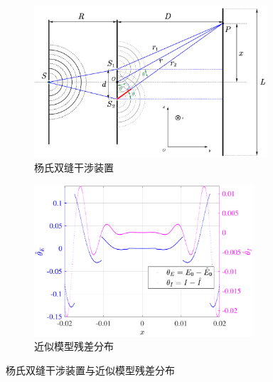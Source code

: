 \documentclass[UTF8]{report}
\theoremstyle{MyLineTheoremStyle} %
\theoremstyle{MyBlockTheoremStyle} %
\theoremstyle{MySubsubsectionStyle} %
\begin{document}
\begin{figure}[H]\centering
    \begin{subfigure}[t]{0.52\columnwidth}\centering
        \includegraphics[height=160pt]{assets/3/杨双.pdf}
        \caption{ 杨氏双缝干涉装置 }
    \end{subfigure}\begin{subfigure}[t]{0.48\columnwidth}\centering
        \includegraphics[height=160pt]{assets/3/杨残差.pdf}
        \caption{ 近似模型残差分布 }
    \end{subfigure}
    \caption{ 杨氏双缝干涉装置与近似模型残差分布 }\label{杨氏双缝干涉装置}
\end{figure}
\end{document}
